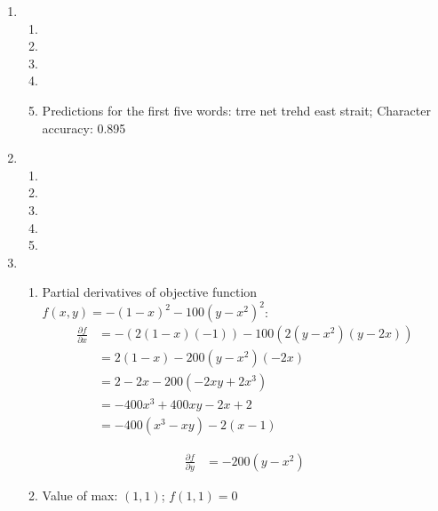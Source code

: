 \documentclass[12pt]{article}
\begin{document}
\begin{enumerate}
\item %
\begin{enumerate}
\item %
\item %
\item %
\item %
\item %
Predictions for the first five words: trre net trehd east strait; Character accuracy: 0.895
\end{enumerate}

\item %
\begin{enumerate}
\item %
\item %
\item %
\item %
\item %
\end{enumerate}

\item %
\begin{enumerate}
\item Partial derivatives of objective function $f(x,y) = -(1-x)^2-100(y-x^2)^2$:
\begin{align*}
\frac{\partial f}{\partial x} &= -(2(1-x)(-1))-100(2(y-x^2)(y-2x))\\
&= 2(1-x)-200(y-x^2)(-2x)\\
&= 2-2x-200(-2xy+2x^3)\\
&= -400x^3+400xy-2x+2\\
&= -400(x^3-xy)-2(x-1)
\end{align*}

\begin{align*}
\frac{\partial f}{\partial y} &= -200(y-x^2)
\end{align*}

\item Value of max: $(1, 1)$; $f(1,1) = 0$
\end{enumerate}

\end{enumerate}
\end{document}
